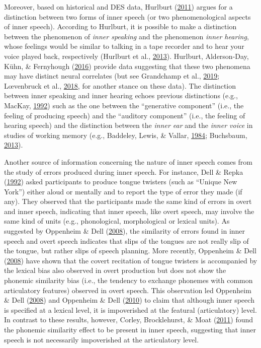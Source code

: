 \documentclass[a4paper,12pt,twoside,onecolumn,openright,final,oldfontcommands]{memoir}
\begin{document}
Moreover, based on historical and DES data, Hurlburt (\protect\hyperlink{ref-Hurlburt2011}{2011}) argues for a distinction between two forms of inner speech (or two phenomenological aspects of inner speech). According to Hurlburt, it is possible to make a distinction between the phenomenon of \emph{inner speaking} and the phenomenon \emph{inner hearing}, whose feelings would be similar to talking in a tape recorder and to hear your voice played back, respectively (Hurlburt et al., \protect\hyperlink{ref-Hurlburt2013}{2013}). Hurlburt, Alderson-Day, Kühn, \& Fernyhough (\protect\hyperlink{ref-hurlburt_exploring_2016}{2016}) provide data suggesting that these two phenomena may have distinct neural correlates (but see Grandchamp et al., \protect\hyperlink{ref-grandchamp_condensation_2019}{2019}; Lœvenbruck et al., \protect\hyperlink{ref-loevenbruck_cognitive_2018}{2018}, for another stance on these data). The distinction between inner speaking and inner hearing echoes previous distinctions (e.g., MacKay, \protect\hyperlink{ref-mackay_constraints_1992}{1992}) such as the one between the \enquote{generative component} (i.e., the feeling of producing speech) and the \enquote{auditory component} (i.e., the feeling of hearing speech) and the distinction between the \emph{inner ear} and the \emph{inner voice} in studies of working memory (e.g., Baddeley, Lewis, \& Vallar, \protect\hyperlink{ref-baddeley_exploring_1984}{1984}; Buchsbaum, \protect\hyperlink{ref-buchsbaum_role_2013}{2013}).

Another source of information concerning the nature of inner speech comes from the study of errors produced during inner speech. For instance, Dell \& Repka (\protect\hyperlink{ref-dell_errors_1992}{1992}) asked participants to produce tongue twisters (such as \enquote{Unique New York}) either aloud or mentally and to report the type of error they made (if any). They observed that the participants made the same kind of errors in overt and inner speech, indicating that inner speech, like overt speech, may involve the same kind of units (e.g., phonological, morphological or lexical units). As suggested by Oppenheim \& Dell (\protect\hyperlink{ref-oppenheim_inner_2008}{2008}), the similarity of errors found in inner speech and overt speech indicates that slips of the tongues are not really slip of the tongue, but rather slips of speech planning. More recently, Oppenheim \& Dell (\protect\hyperlink{ref-oppenheim_inner_2008}{2008}) have shown that the covert recitation of tongue twisters is accompanied by the lexical bias also observed in overt production but does not show the phonemic similarity bias (i.e., the tendency to exchange phonemes with common articulatory features) observed in overt speech. This observation led Oppenheim \& Dell (\protect\hyperlink{ref-oppenheim_inner_2008}{2008}) and Oppenheim \& Dell (\protect\hyperlink{ref-oppenheim_motor_2010}{2010}) to claim that although inner speech is specified at a lexical level, it is impoverished at the featural (articulatory) level. In contrast to these results, however, Corley, Brocklehurst, \& Moat (\protect\hyperlink{ref-corley_error_2011}{2011}) found the phonemic similarity effect to be present in inner speech, suggesting that inner speech is not necessarily impoverished at the articulatory level.
\end{document}
